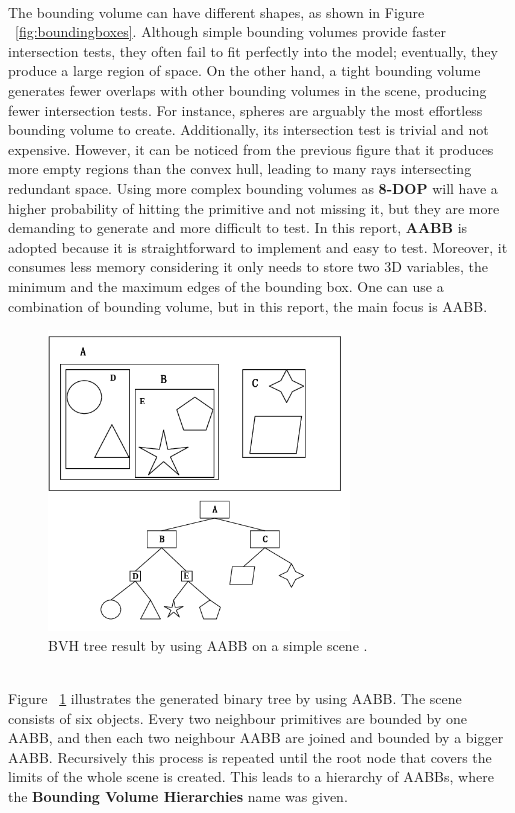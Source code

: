 \documentclass[11pt,a4paper]{article}
\begin{document}
\noindent
\\
The bounding volume can have different shapes, as shown in Figure ~\ref{fig:boundingboxes}. Although simple bounding volumes provide faster intersection tests, they often fail to fit perfectly into the model; eventually, they produce a large region of space. On the other hand, a tight bounding volume generates fewer overlaps with other bounding volumes in the scene, producing fewer intersection tests. For instance, spheres are arguably the most effortless bounding volume to create. Additionally, its intersection test is trivial and not expensive. However, it can be noticed from the previous figure that it produces more empty regions than the convex hull, leading to many rays intersecting redundant space. Using more complex bounding volumes as \textbf{8-DOP} will have a higher probability of hitting the primitive and not missing it, but they are more demanding to generate and more difficult to test. In this report, \textbf{AABB} is adopted because it is straightforward to implement and easy to test. Moreover, it consumes less memory considering it only needs to store two 3D variables, the minimum and the maximum edges of the bounding box. One can use a combination of bounding volume, but in this report, the main focus is AABB.


\begin{figure}[h]	
     \centering
     \captionsetup{justification=centering,margin=2cm}
     \includegraphics[width=8cm]{images/bvh_tree.png}
     \caption{BVH tree result by using AABB on a simple scene
. \protect\cite{Ericson2004} }
        \label{fig:boundingvolume}
\end{figure}

\noindent
\\
Figure ~\ref{fig:boundingvolume} illustrates the generated binary tree by using AABB. The scene consists of six objects. Every two neighbour primitives are bounded by one AABB, and then each two neighbour AABB are joined and bounded by a bigger AABB. Recursively this process is repeated until the root node that covers the limits of the whole scene is created. This leads to a hierarchy of AABBs, where the \textbf{Bounding Volume Hierarchies} name was given.
\end{document}
